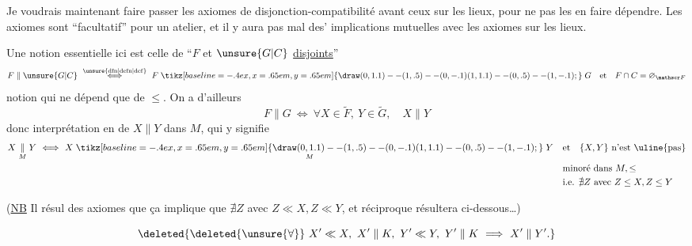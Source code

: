 Je voudrais maintenant faire passer les axiomes de disjonction-compatibilité avant ceux sur les lieux, pour ne pas  les en faire dépendre. Les axiomes sont ``facultatif'' pour un atelier, et il y aura pas mal des' implications mutuelles avec les axiomes sur les lieux.

Une notion essentielle ici est celle de ``$F$ et $\unsure{G|C}$ \uline{disjoints}''
\[
 F\parallel\unsure{G|C}\ \overset{\unsure{\mathrm{dfn}|\mathrm{defn}|\mathrm{def}}}{\Longleftrightarrow}\ F\mathrel{\tikz[baseline=-.4ex,x=.65em,y=.65em]{\draw (0,1.1)--(1,.5)--(0,-.1) (1,1.1)--(0,.5)--(1,-.1);}}G\quad\text{et}\quad F\cap C=\varnothing_{\mathscr F}
\]
notion qui ne dépend que de $\leq$. On a d'ailleurs
\[
 F\parallel G\ \Longleftrightarrow\ \forall X\in\widetilde F,\ Y\in\widetilde G,\quad X\parallel Y
\]
donc interprétation en  de $X\parallel Y$ dans $M$, qui y signifie
\[
\begin{aligned}
X\mathrel{\underset{M}{\parallel}}Y\ \Longleftrightarrow\
 X\mathrel{\underset{M}{\mathrel{\tikz[baseline=-.4ex,x=.65em,y=.65em]{\draw (0,1.1)--(1,.5)--(0,-.1) (1,1.1)--(0,.5)--(1,-.1);}}}}Y\quad &\text{et}\quad\{X,Y\}\ \text{n'est \uline{pas}}\\
&\text{minoré dans } M,\leq\\
&\text{i.e. }\nexists Z\ \text{avec }Z\leq X,Z\leq Y
\end{aligned}
\]

(\uline{NB} Il résul des axiomes  que ça implique que $\nexists Z$ avec $Z\ll X,Z\ll Y$, \deleted{\unsure{i.e.} \unsure{c'est un} $\unsure{\exists|]}$} et  réciproque résultera  ci-dessous\ldots)

%
\[
\deleted{\deleted{\unsure{\forall}}\ X'\ll X,\ X'\parallel K,\ Y'\ll Y,\ Y'\parallel K\ \Longrightarrow\ X'\parallel Y'.}
\]

